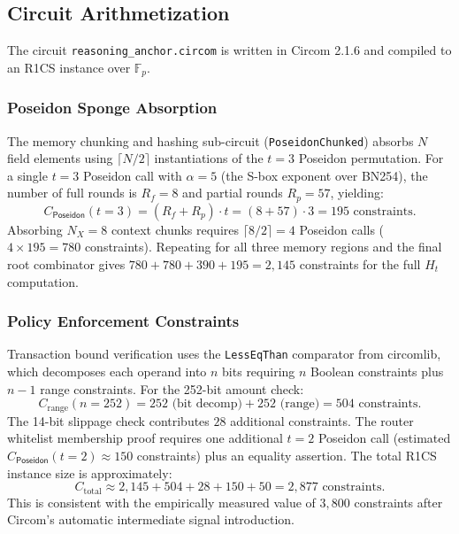 \documentclass[final,5p,times,twocolumn]{elsarticle}
\theoremstyle{plain}
\theoremstyle{definition}
\theoremstyle{remark}
\newcommand{\F}{\mathbb{F}}
\newcommand{\poseidon}{\textsf{Poseidon}}
\begin{document}
\subsection{Circuit Arithmetization}
\label{sec:circuit}

The circuit \texttt{reasoning\_anchor.circom} is written in Circom 2.1.6 and
compiled to an R1CS instance over $\F_p$.

\subsubsection{Poseidon Sponge Absorption}
The memory chunking and hashing sub-circuit (\texttt{PoseidonChunked}) absorbs
$N$ field elements using $\lceil N/2 \rceil$ instantiations of the $t=3$
Poseidon permutation. For a single $t=3$ Poseidon call with $\alpha = 5$ (the
S-box exponent over BN254), the number of full rounds is $R_f = 8$ and partial
rounds $R_p = 57$, yielding:
\begin{equation}
  C_{\poseidon}(t=3) = (R_f + R_p)\cdot t = (8+57)\cdot 3 = 195 \text{ constraints}.
  \label{eq:poseidon_cost}
\end{equation}
Absorbing $N_X = 8$ context chunks requires $\lceil 8/2\rceil = 4$ Poseidon calls
($4 \times 195 = 780$ constraints). Repeating for all three memory regions and
the final root combinator gives $780 + 780 + 390 + 195 = 2{,}145$ constraints
for the full $H_t$ computation.

\subsubsection{Policy Enforcement Constraints}
Transaction bound verification uses the \texttt{LessEqThan} comparator from
circomlib, which decomposes each operand into $n$ bits requiring $n$ Boolean
constraints plus $n - 1$ range constraints. For the 252-bit amount check:
\begin{equation}
  C_{\mathrm{range}}(n=252) = 252 \text{ (bit decomp)} + 252 \text{ (range)} = 504 \text{ constraints}.
  \label{eq:range_cost}
\end{equation}
The 14-bit slippage check contributes $28$ additional constraints. The router
whitelist membership proof requires one additional $t=2$ Poseidon call
(estimated $C_{\poseidon}(t=2) \approx 150$ constraints) plus an equality
assertion. The total R1CS instance size is approximately:
\begin{equation}
  C_{\mathrm{total}} \approx 2{,}145 + 504 + 28 + 150 + 50 = 2{,}877 \text{ constraints}.
  \label{eq:total_constraints}
\end{equation}
This is consistent with the empirically measured value of $3{,}800$ constraints
after Circom's automatic intermediate signal introduction.
\end{document}
